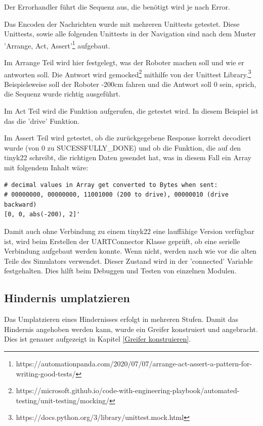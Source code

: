 Der Errorhandler führt die Sequenz aus, die benötigt wird je nach Error.

Das Encoden der Nachrichten wurde mit mehreren Unittests getestet. Diese Unittests, sowie alle folgenden Unittests in der Navigation sind nach dem Muster 'Arrange, Act, Assert'\footnote{https://automationpanda.com/2020/07/07/arrange-act-assert-a-pattern-for-writing-good-tests/} aufgebaut.

Im Arrange Teil wird hier festgelegt, was der Roboter machen soll und wie er antworten soll. Die Antwort wird gemocked\footnote{https://microsoft.github.io/code-with-engineering-playbook/automated-testing/unit-testing/mocking/} mithilfe von der Unittest Library.\footnote{https://docs.python.org/3/library/unittest.mock.html} Beispielsweise soll der Roboter -200cm fahren und die Antwort soll 0 sein, sprich, die Sequenz wurde richtig ausgeführt.

Im Act Teil wird die Funktion aufgerufen, die getestet wird. In diesem Beispiel ist das die 'drive' Funktion.

Im Assert Teil wird getestet, ob die zurückgegebene Response korrekt decodiert wurde (von 0 zu SUCESSFULLY\_DONE) und ob die Funktion, die auf den \gls{tinyk22} schreibt, die richtigen Daten gesendet hat, was in diesem Fall ein Array mit folgendem Inhalt wäre:

\begin{verbatim}
# decimal values in Array get converted to Bytes when sent:
# 00000000, 00000000, 11001000 (200 to drive), 00000010 (drive backward)
[0, 0, abs(-200), 2]'
\end{verbatim}

Damit auch ohne Verbindung zu einem \gls{tinyk22} eine lauffähige Version verfügbar ist, wird beim Erstellen der UARTConnector Klasse geprüft, ob eine serielle Verbindung aufgebaut werden konnte. Wenn nicht, werden nach wie vor die alten Teile des Simulators verwendet. Dieser Zustand wird in der 'connected' Variable festgehalten. Dies hilft beim Debuggen und Testen von einzelnen Modulen.


\newpage
\subsection{Hindernis umplatzieren}

Das Umplatzieren eines Hindernisses erfolgt in mehreren Stufen. Damit das Hindernis angehoben werden kann, wurde ein Greifer konstruiert und angebracht. Dies ist genauer aufgezeigt in Kapitel \ref{Greifer konstruieren}.

